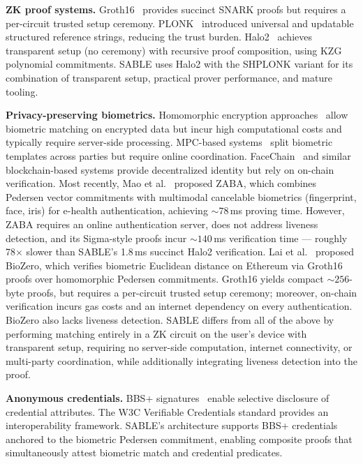 \documentclass[conference]{IEEEtran}
\begin{document}
\textbf{ZK proof systems.} Groth16~\cite{groth2016} provides succinct SNARK proofs but requires a per-circuit trusted setup ceremony. PLONK~\cite{gabizon2019} introduced universal and updatable structured reference strings, reducing the trust burden. Halo2~\cite{zcash-halo2} achieves transparent setup (no ceremony) with recursive proof composition, using KZG polynomial commitments. SABLE uses Halo2 with the SHPLONK variant for its combination of transparent setup, practical prover performance, and mature tooling.

\textbf{Privacy-preserving biometrics.} Homomorphic encryption approaches~\cite{yasuda2013,boddeti2018} allow biometric matching on encrypted data but incur high computational costs and typically require server-side processing. MPC-based systems~\cite{bringer2014} split biometric templates across parties but require online coordination. FaceChain~\cite{guo2020} and similar blockchain-based systems provide decentralized identity but rely on on-chain verification. Most recently, Mao et al.~\cite{mao2025} proposed ZABA, which combines Pedersen vector commitments with multimodal cancelable biometrics (fingerprint, face, iris) for e-health authentication, achieving ${\sim}78$\,ms proving time. However, ZABA requires an online authentication server, does not address liveness detection, and its Sigma-style proofs incur ${\sim}140$\,ms verification time --- roughly 78$\times$ slower than SABLE's 1.8\,ms succinct Halo2 verification. Lai et al.~\cite{lai2024} proposed BioZero, which verifies biometric Euclidean distance on Ethereum via Groth16 proofs over homomorphic Pedersen commitments. Groth16 yields compact ${\sim}256$-byte proofs, but requires a per-circuit trusted setup ceremony; moreover, on-chain verification incurs gas costs and an internet dependency on every authentication. BioZero also lacks liveness detection. SABLE differs from all of the above by performing matching entirely in a ZK circuit on the user's device with transparent setup, requiring no server-side computation, internet connectivity, or multi-party coordination, while additionally integrating liveness detection into the proof.

\textbf{Anonymous credentials.} BBS+ signatures~\cite{boneh2004,camenisch2016} enable selective disclosure of credential attributes. The W3C Verifiable Credentials standard provides an interoperability framework. SABLE's architecture supports BBS+ credentials anchored to the biometric Pedersen commitment, enabling composite proofs that simultaneously attest biometric match and credential predicates.
\end{document}
